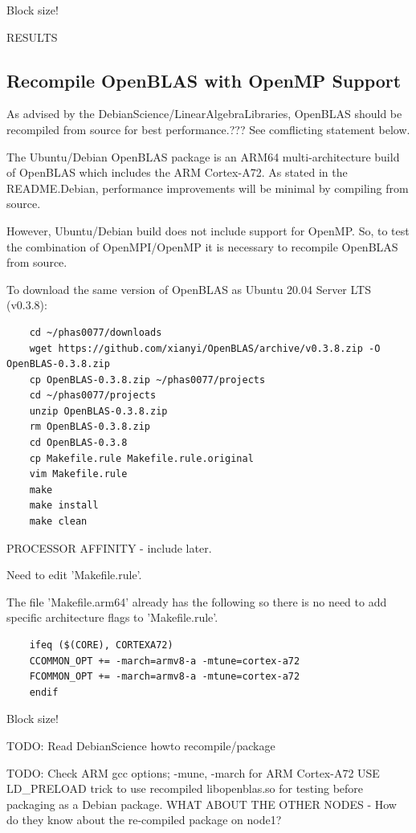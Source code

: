 \documentclass{article}
\begin{document}
Block size!

RESULTS

\subsection{Recompile OpenBLAS with OpenMP Support}

As advised by the DebianScience/LinearAlgebraLibraries, OpenBLAS should be recompiled from source for best performance.??? See comflicting statement below.

The Ubuntu/Debian OpenBLAS package is an ARM64 multi-architecture build of OpenBLAS which includes the ARM Cortex-A72. As stated in the README.Debian, performance improvements will be minimal by compiling from source.

However, Ubuntu/Debian build does not include support for OpenMP. So, to test the combination of OpenMPI/OpenMP it is necessary to recompile OpenBLAS from source.

To download the same version of OpenBLAS as Ubuntu 20.04 Server LTS (v0.3.8):

\begin{verbatim}
    cd ~/phas0077/downloads
    wget https://github.com/xianyi/OpenBLAS/archive/v0.3.8.zip -O OpenBLAS-0.3.8.zip
    cp OpenBLAS-0.3.8.zip ~/phas0077/projects
    cd ~/phas0077/projects
    unzip OpenBLAS-0.3.8.zip
    rm OpenBLAS-0.3.8.zip
    cd OpenBLAS-0.3.8
    cp Makefile.rule Makefile.rule.original
    vim Makefile.rule
    make
    make install
    make clean
\end{verbatim}

PROCESSOR AFFINITY - include later.

Need to edit 'Makefile.rule'.

The file 'Makefile.arm64' already has the following so there is no need to add specific architecture flags to 'Makefile.rule'.

\begin{verbatim}
    ifeq ($(CORE), CORTEXA72)
    CCOMMON_OPT += -march=armv8-a -mtune=cortex-a72
    FCOMMON_OPT += -march=armv8-a -mtune=cortex-a72
    endif
\end{verbatim}



Block size!

TODO: Read DebianScience howto recompile/package

TODO: Check ARM gcc options; -mune, -march for ARM Cortex-A72
USE LD\_PRELOAD trick to use recompiled libopenblas.so for testing before packaging as a Debian package. WHAT ABOUT THE OTHER NODES - How do they know about the re-compiled package on node1?
\end{document}
